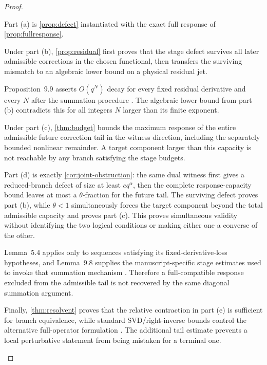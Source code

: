 \documentclass[12pt]{article}
\theoremstyle{plain}
\theoremstyle{definition}
\theoremstyle{remark}
\begin{document}
\begin{proof}
\begin{prooflines}
\item Part (a) is \cref{prop:defect} instantiated with the exact full response of \cref{prop:fullresponse}.
\item Under part (b), \cref{prop:residual} first proves that the stage defect survives all later admissible corrections in the chosen functional, then transfers the surviving mismatch to an algebraic lower bound on a physical residual jet.
\item Proposition~9.9 asserts \(O(q^N)\) decay for every fixed residual derivative and every \(N\) after the summation procedure \cite[Prop.~9.9]{OpenAI2026}. The algebraic lower bound from part (b) contradicts this for all integers \(N\) larger than its finite exponent.
\item Under part (c), \cref{thm:budget} bounds the maximum response of the entire admissible future correction tail in the witness direction, including the separately bounded nonlinear remainder. A target component larger than this capacity is not reachable by any branch satisfying the stage budgets.
\item Part (d) is exactly \cref{cor:joint-obstruction}: the same dual witness first gives a reduced-branch defect of size at least \(cq^\alpha\), then the complete response-capacity bound leaves at most a \(\theta\)-fraction for the future tail. The surviving defect proves part (b), while \(\theta<1\) simultaneously forces the target component beyond the total admissible capacity and proves part (c). This proves simultaneous validity without identifying the two logical conditions or making either one a converse of the other.
\item Lemma~5.4 applies only to sequences satisfying its fixed-derivative-loss hypotheses, and Lemma~9.8 supplies the manuscript-specific stage estimates used to invoke that summation mechanism \cite[Lemmas~5.4 and 9.8]{OpenAI2026}. Therefore a full-compatible response excluded from the admissible tail is not recovered by the same diagonal summation argument.
\item Finally, \cref{thm:resolvent} proves that the relative contraction in part (e) is sufficient for branch equivalence, while standard SVD/right-inverse bounds control the alternative full-operator formulation \cite{StewartSun1990,Wedin1972,GolubVanLoan2013}. The additional tail estimate prevents a local perturbative statement from being mistaken for a terminal one.
\end{prooflines}
\end{proof}
\end{document}
